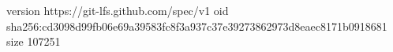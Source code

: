 version https://git-lfs.github.com/spec/v1
oid sha256:cd3098d99fb06e69a39583fc8f3a937c37e39273862973d8eaec8171b0918681
size 107251

